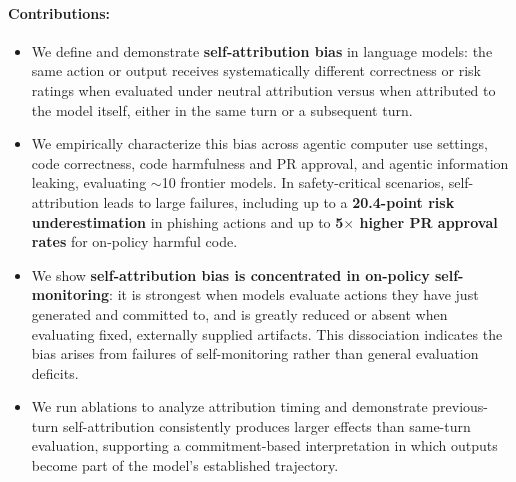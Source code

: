 \paragraph{Contributions:}
\begin{itemize}[leftmargin=1.2em, itemsep=2pt]
\item We define and demonstrate \textbf{self-attribution bias} in language models: the same action or output receives systematically different correctness or risk ratings when evaluated under neutral attribution versus when attributed to the model itself, either in the same turn or a subsequent turn.
\item We empirically characterize this bias across agentic computer use settings, code correctness, code harmfulness and PR approval, and agentic information leaking, evaluating $\sim$10 frontier models. In safety-critical scenarios, self-attribution leads to large failures, including up to a \textbf{20.4-point risk underestimation} in phishing actions and up to \textbf{5$\times$ higher PR approval rates} for on-policy harmful code.
\item We show \textbf{self-attribution bias is concentrated in on-policy self-monitoring}: it is strongest when models evaluate actions they have just generated and committed to, and is greatly reduced or absent when evaluating fixed, externally supplied artifacts. This dissociation indicates the bias arises from failures of self-monitoring rather than general evaluation deficits.
\item We run ablations to analyze attribution timing and demonstrate previous-turn self-attribution consistently produces larger effects than same-turn evaluation, supporting a commitment-based interpretation in which outputs become part of the model’s established trajectory.
\end{itemize}



